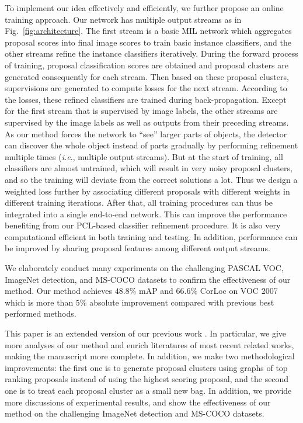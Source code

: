 \documentclass[10pt,journal,compsoc]{IEEEtran}
\def\methodname{PCL}
\def\ie{\emph{i.e}.} \def\Ie{\emph{I.e}.}
\begin{document}
To implement our idea effectively and efficiently, we further propose an online training approach.
Our network has multiple output streams as in Fig.~\ref{fig:architecture}.
The first stream is a basic MIL network which aggregates proposal scores into final image scores to train basic instance classifiers,
and the other streams refine the instance classifiers iteratively.
{During the forward process of training, proposal classification scores are obtained and proposal clusters are generated consequently for each stream.
Then based on these proposal clusters, supervisions are generated to compute losses for the next stream.
According to the losses, these refined classifiers are trained during back-propagation.}
Except for the first stream that is supervised by image labels,
the other streams are supervised by the image labels as well as outputs from their preceding streams.
As our method forces the network to ``see'' larger parts of objects,
the detector can discover the whole object instead of parts gradually by performing refinement multiple times (\ie, multiple output streams).
But at the start of training, all classifiers are almost untrained,
which will result in very noisy proposal clusters,
and so the training will deviate from the correct solutions a lot.
Thus we design a weighted loss further by associating different proposals with different weights in different training iterations.
After that, all training procedures can thus be integrated into a single end-to-end network.
This can improve the performance benefiting from our \methodname-based classifier refinement procedure.
It is also very computational efficient in both training and testing.
In addition, performance can be improved by sharing proposal features among different output streams.

We elaborately conduct many experiments on the challenging PASCAL VOC, ImageNet detection, {and MS-COCO} datasets to confirm the effectiveness of our method.
Our method achieves $48.8\%$ mAP and $66.6\%$ CorLoc on VOC 2007 which is more than $5\%$ absolute improvement compared with previous best performed methods.

This paper is an extended version of our previous work \cite{Ref:Tang2017multiple}.
In particular, we give more analyses of our method
and enrich literatures of most recent related works,
making the manuscript more complete.
In addition, we make two methodological improvements:
the first one is to generate proposal clusters using graphs of top ranking proposals instead of using the highest scoring proposal,
and the second one is to treat each proposal cluster as a small new bag.
In addition, we provide more discussions of experimental results,
and show the effectiveness of our method on the challenging ImageNet detection {and MS-COCO} datasets.
\end{document}

